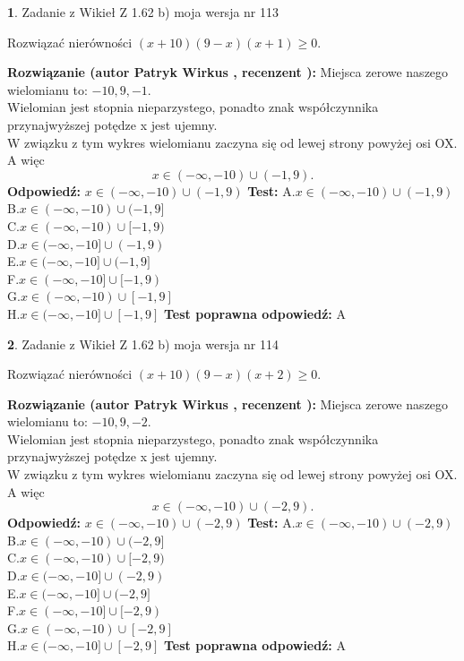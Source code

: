 \documentclass[12pt, a4paper]{article}
\theoremstyle{definition} %
\newtheorem{zad}{}
\newcommand{\zadStart}[1]{\begin{zad}#1\newline}
\newcommand{\zadStop}{\end{zad}}
\newcommand{\rozwStart}[2]{\noindent \textbf{Rozwiązanie (autor #1 , recenzent #2): }\newline}
\newcommand{\rozwStop}{\newline}
\newcommand{\odpStart}{\noindent \textbf{Odpowiedź:}\newline}
\newcommand{\odpStop}{\newline}
\newcommand{\testStart}{\noindent \textbf{Test:}\newline}
\newcommand{\testStop}{\newline}
\newcommand{\kluczStart}{\noindent \textbf{Test poprawna odpowiedź:}\newline}
\newcommand{\kluczStop}{\newline}
\begin{document}
\zadStart{Zadanie z Wikieł Z 1.62 b) moja wersja nr 113}

Rozwiązać nierówności $(x+10)(9-x)(x+1)\ge0$.
\zadStop
\rozwStart{Patryk Wirkus}{}
Miejsca zerowe naszego wielomianu to: $-10, 9, -1$.\\
Wielomian jest stopnia nieparzystego, ponadto znak współczynnika przy\linebreak najwyższej potędze x jest ujemny.\\ W związku z tym wykres wielomianu zaczyna się od lewej strony powyżej osi OX. A więc $$x \in (-\infty,-10) \cup (-1,9).$$
\rozwStop
\odpStart
$x \in (-\infty,-10) \cup (-1,9)$
\odpStop
\testStart
A.$x \in (-\infty,-10) \cup (-1,9)$\\
B.$x \in (-\infty,-10) \cup (-1,9]$\\
C.$x \in (-\infty,-10) \cup [-1,9)$\\
D.$x \in (-\infty,-10] \cup (-1,9)$\\
E.$x \in (-\infty,-10] \cup (-1,9]$\\
F.$x \in (-\infty,-10] \cup [-1,9)$\\
G.$x \in (-\infty,-10) \cup [-1,9]$\\
H.$x \in (-\infty,-10] \cup [-1,9]$
\testStop
\kluczStart
A
\kluczStop



\zadStart{Zadanie z Wikieł Z 1.62 b) moja wersja nr 114}

Rozwiązać nierówności $(x+10)(9-x)(x+2)\ge0$.
\zadStop
\rozwStart{Patryk Wirkus}{}
Miejsca zerowe naszego wielomianu to: $-10, 9, -2$.\\
Wielomian jest stopnia nieparzystego, ponadto znak współczynnika przy\linebreak najwyższej potędze x jest ujemny.\\ W związku z tym wykres wielomianu zaczyna się od lewej strony powyżej osi OX. A więc $$x \in (-\infty,-10) \cup (-2,9).$$
\rozwStop
\odpStart
$x \in (-\infty,-10) \cup (-2,9)$
\odpStop
\testStart
A.$x \in (-\infty,-10) \cup (-2,9)$\\
B.$x \in (-\infty,-10) \cup (-2,9]$\\
C.$x \in (-\infty,-10) \cup [-2,9)$\\
D.$x \in (-\infty,-10] \cup (-2,9)$\\
E.$x \in (-\infty,-10] \cup (-2,9]$\\
F.$x \in (-\infty,-10] \cup [-2,9)$\\
G.$x \in (-\infty,-10) \cup [-2,9]$\\
H.$x \in (-\infty,-10] \cup [-2,9]$
\testStop
\kluczStart
A
\kluczStop
\end{document}

